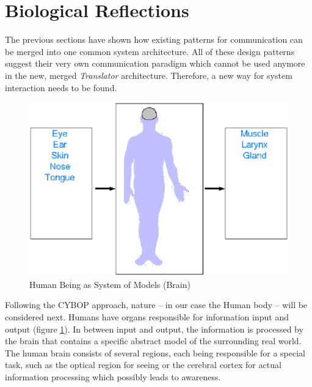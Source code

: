 %
%
%
%
%
%
%

\section{Biological Reflections}
\label{biological_reflections_heading}

The previous sections have shown how existing patterns for communication can be
merged into one common system architecture. All of these design patterns suggest
their very own communication paradigm which cannot be used anymore in the new,
merged \emph{Translator} architecture. Therefore, a new way for system interaction
needs to be found.

\begin{figure}[ht]
    \begin{center}
        \includegraphics[scale=0.3]{vector/human_being_as_system.eps}
        \caption{Human Being as System of Models (Brain)}
        \label{human_being_as_system_figure}
    \end{center}
\end{figure}

Following the CYBOP approach, nature -- in our case the Human body -- will be
considered next. Humans have organs responsible for information input and output
(figure \ref{human_being_as_system_figure}). In between input and output, the
information is processed by the brain that contains a specific abstract model
of the surrounding real world. The human brain consists of several regions, each
being responsible for a special task, such as the optical region for seeing or the
cerebral cortex for actual information processing which possibly leads to awareness.

